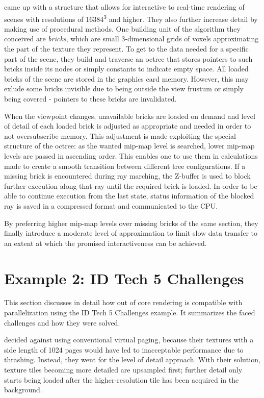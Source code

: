 \cite{Crassin:2009:GRS:1507149.1507152} came up with a structure that allows for interactive to real-time rendering of scenes with resolutions of 16384\textsuperscript{3} and higher. They also further increase detail by making use of procedural methods. One building unit of the algorithm they conceived are \textit{bricks}, which are small 3-dimensional grids of voxels approximating the part of the texture they represent. To get to the data needed for a specific part of the scene, they build and traverse an octree that stores pointers to such bricks inside its nodes or simply constants to indicate empty space. All loaded bricks of the scene are stored in the graphics card memory. However, this may exlude some bricks invisible due to being outside the view frustum or simply being covered - pointers to these bricks are invalidated. 

When the viewpoint changes, unavailable bricks are loaded on demand and level of detail of each loaded brick is adjusted as appropriate and needed in order to not oversubscribe memory. This adjustment is made exploiting the special structure of the octree: as the wanted mip-map level is searched, lower mip-map levels are passed in ascending order. This enables one to use them in calculations made to create a smooth transition between different tree configurations. If a missing brick is encountered during ray marching, the Z-buffer is used to block further execution along that ray until the required brick is loaded. In order to be able to continue execution from the last state, status information of the blocked ray is saved in a compressed format and communicated to the CPU.

By preferring higher mip-map levels over missing bricks of the same section, they finally introduce a moderate level of approximation to limit slow data transfer to an extent at which the promised interactiveness can be achieved.

\section{Example 2: ID Tech 5 Challenges}

This section discusses in detail how out of core rendering is compatible with parallelization using the ID Tech 5 Challenges example. It summarizes the faced challenges and how they were solved. 

\cite{van2009id} decided against using conventional virtual paging, because their textures with a side length of 1024 pages would have led to inacceptable performance due to thrashing. Instead, they went for the level of detail approach. With their solution, texture tiles becoming more detailed are upsampled first; further detail only starts being loaded after the higher-resolution tile has been acquired in the background.

